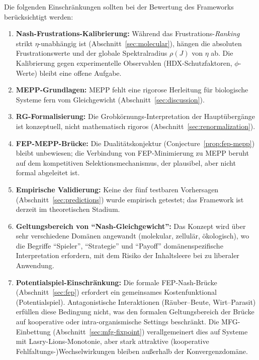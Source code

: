 \documentclass[12pt,a4paper]{article}
\theoremstyle{remark}
\begin{document}
Die folgenden Einschr\"ankungen sollten bei der Bewertung des Frameworks ber\"ucksichtigt werden:
\begin{enumerate}
    \item \textbf{Nash-Frustrations-Kalibrierung:} W\"ahrend das Frustrations-\emph{Ranking} strikt $\eta$-unabh\"angig ist (Abschnitt~\ref{sec:molecular}), h\"angen die absoluten Frustrationswerte und der globale Spektralradius $\rho(J)$ von $\eta$ ab. Die Kalibrierung gegen experimentelle Observablen (HDX-Schutzfaktoren, $\phi$-Werte) bleibt eine offene Aufgabe.
    \item \textbf{MEPP-Grundlagen:} MEPP fehlt eine rigorose Herleitung f\"ur biologische Systeme fern vom Gleichgewicht (Abschnitt~\ref{sec:discussion}).
    \item \textbf{RG-Formalisierung:} Die Grobk\"ornungs-Interpretation der Haupt\"uberg\"ange ist konzeptuell, nicht mathematisch rigoros (Abschnitt~\ref{sec:renormalization}).
    \item \textbf{FEP-MEPP-Br\"ucke:} Die Dualit\"atskonjektur (Conjecture~\ref{prop:fep-mepp}) bleibt unbewiesen; die Verbindung von FEP-Minimierung zu MEPP beruht auf dem kompetitiven Selektionsmechanismus, der plausibel, aber nicht formal abgeleitet ist.
    \item \textbf{Empirische Validierung:} Keine der f\"unf testbaren Vorhersagen (Abschnitt~\ref{sec:predictions}) wurde empirisch getestet; das Framework ist derzeit im theoretischen Stadium.
    \item \textbf{Geltungsbereich von ``Nash-Gleichgewicht'':} Das Konzept wird \"uber sehr verschiedene Dom\"anen angewandt (molekular, zellul\"ar, \"okologisch), wo die Begriffe ``Spieler'', ``Strategie'' und ``Payoff'' dom\"anenspezifische Interpretation erfordern, mit dem Risiko der Inhaltsleere bei zu liberaler Anwendung.
    \item \textbf{Potentialspiel-Einschr\"ankung:} Die formale FEP-Nash-Br\"ucke (Abschnitt~\ref{sec:fep}) erfordert ein gemeinsames Kostenfunktional (Potentialspiel). Antagonistische Interaktionen (R\"auber--Beute, Wirt--Parasit) erf\"ullen diese Bedingung nicht, was den formalen Geltungsbereich der Br\"ucke auf kooperative oder intra-organismische Settings beschr\"ankt. Die MFG-Einbettung (Abschnitt~\ref{sec:mfg-fixpoint}) verallgemeinert dies auf Systeme mit Lasry-Lions-Monotonie, aber stark attraktive (kooperative Fehlfaltungs-)Wechselwirkungen bleiben au\ss{}erhalb der Konvergenzdom\"ane.
\end{enumerate}
\end{document}

